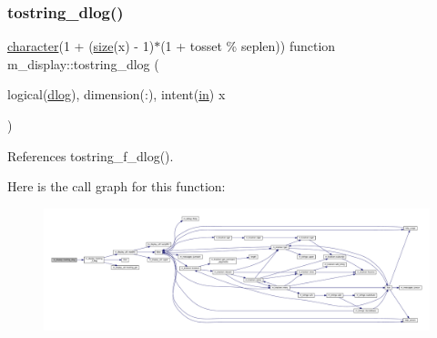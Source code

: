 \subsubsection{\texorpdfstring{tostring\+\_\+dlog()}{tostring\_dlog()}}
{\footnotesize\ttfamily \hyperlink{option__stopwatch_83_8txt_abd4b21fbbd175834027b5224bfe97e66}{character}(1 + (\hyperlink{what__overview_81_8txt_ab5692ed87074f1d5ec850a9ffa8b5af9}{size}(x) -\/ 1)$\ast$(1 + tosset \% seplen)) function m\+\_\+display\+::tostring\+\_\+dlog (\begin{DoxyParamCaption}\item[{logical(\hyperlink{namespacem__display_a8c6a3df510feabf6bc84dd0a8789f98c}{dlog}), dimension(\+:), intent(\hyperlink{M__journal_83_8txt_afce72651d1eed785a2132bee863b2f38}{in})}]{x }\end{DoxyParamCaption})\hspace{0.3cm}{\ttfamily [private]}}



References tostring\+\_\+f\+\_\+dlog().

Here is the call graph for this function\+:
\nopagebreak
\begin{figure}[H]
\begin{center}
\leavevmode
\includegraphics[width=350pt]{namespacem__display_ac4b7da9242ea26fd744e1301444d374a_cgraph}
\end{center}
\end{figure}
\mbox{\label{namespacem__display_a7bab74c992649c74c27fe924c235e448}} 
